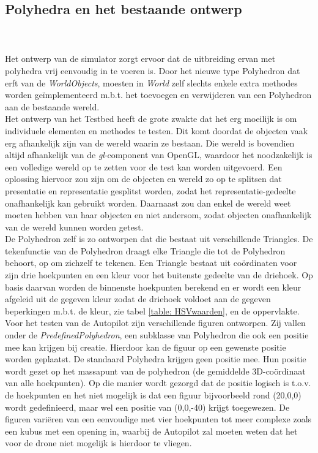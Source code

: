 \subsection{Polyhedra en het bestaande ontwerp}
\\\\
Het ontwerp van de simulator zorgt ervoor dat de uitbreiding ervan met polyhedra vrij eenvoudig in te voeren is. Door het nieuwe type Polyhedron dat erft van de \textit{WorldObjects}, moesten in \textit{World} zelf slechts enkele extra methodes worden ge\"implementeerd m.b.t. het toevoegen en verwijderen van een Polyhedron aan de bestaande wereld.\\
\noindent
Het ontwerp van het Testbed heeft de grote zwakte dat het erg moeilijk is om individuele elementen en methodes te testen. Dit komt doordat de objecten vaak erg afhankelijk zijn van de wereld waarin ze bestaan. Die wereld is bovendien altijd afhankelijk van de \textit{gl}-component van OpenGL, waardoor het noodzakelijk is een volledige wereld op te zetten voor de test kan worden uitgevoerd. Een oplossing hiervoor zou zijn om de objecten en wereld zo op te splitsen dat presentatie en representatie gesplitst worden, zodat het representatie-gedeelte onafhankelijk kan gebruikt worden. Daarnaast zou dan enkel de wereld weet moeten hebben van haar objecten en niet andersom, zodat objecten onafhankelijk van de wereld kunnen worden getest.\\

\noindent 
De Polyhedron zelf is zo ontworpen dat die bestaat uit verschillende Triangles. De tekenfunctie van de Polyhedron draagt elke Triangle die tot de Polyhedron behoort, op om zichzelf te tekenen. Een Triangle bestaat uit co\"ordinaten voor zijn drie hoekpunten en een kleur voor het buitenste gedeelte van de driehoek. Op basis daarvan worden de binnenste hoekpunten berekend en er wordt een kleur afgeleid uit de gegeven kleur zodat de driehoek voldoet aan de gegeven beperkingen m.b.t. de kleur, zie tabel \ref{table: HSVwaarden}, en de oppervlakte.\\
\noindent
Voor het testen van de Autopilot zijn verschillende figuren ontworpen. Zij vallen onder de \textit{PredefinedPolyhedron}, een subklasse van Polyhedron die ook een positie mee kan krijgen bij creatie. Hierdoor kan de figuur op een gewenste positie worden geplaatst. De standaard Polyhedra krijgen geen positie mee. Hun positie wordt gezet op het massapunt van de polyhedron (de gemiddelde 3D-co\"ordinaat van alle hoekpunten). Op die manier wordt gezorgd dat de positie logisch is t.o.v. de hoekpunten en het niet mogelijk is dat een figuur bijvoorbeeld rond (20,0,0) wordt gedefinieerd, maar wel een positie van (0,0,-40) krijgt toegewezen. De figuren vari\"eren van een eenvoudige met vier hoekpunten tot meer complexe zoals een kubus met een opening in, waarbij de Autopilot zal moeten weten dat het voor de drone niet mogelijk is hierdoor te vliegen.

